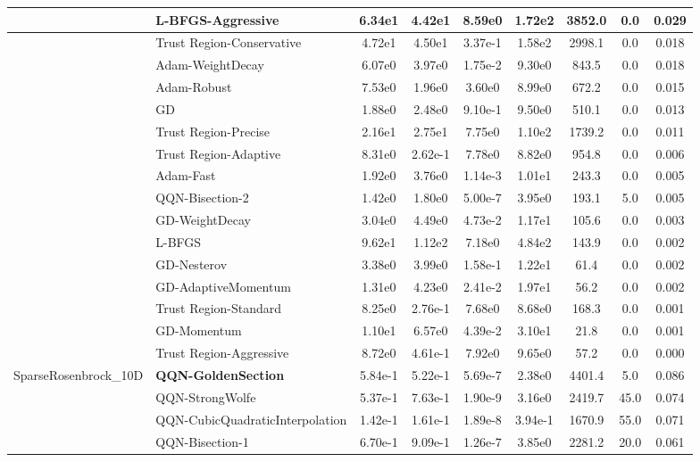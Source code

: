 \documentclass[10pt]{article}
\begin{document}
\begin{longtable}{|l|l|c|c|c|c|c|c|c|}
\hline
 & L-BFGS-Aggressive & 6.34e1 & 4.42e1 & 8.59e0 & 1.72e2 & 3852.0 & 0.0 & 0.029 \\
\hline
 & Trust Region-Conservative & 4.72e1 & 4.50e1 & 3.37e-1 & 1.58e2 & 2998.1 & 0.0 & 0.018 \\
\hline
 & Adam-WeightDecay & 6.07e0 & 3.97e0 & 1.75e-2 & 9.30e0 & 843.5 & 0.0 & 0.018 \\
\hline
 & Adam-Robust & 7.53e0 & 1.96e0 & 3.60e0 & 8.99e0 & 672.2 & 0.0 & 0.015 \\
\hline
 & GD & 1.88e0 & 2.48e0 & 9.10e-1 & 9.50e0 & 510.1 & 0.0 & 0.013 \\
\hline
 & Trust Region-Precise & 2.16e1 & 2.75e1 & 7.75e0 & 1.10e2 & 1739.2 & 0.0 & 0.011 \\
\hline
 & Trust Region-Adaptive & 8.31e0 & 2.62e-1 & 7.78e0 & 8.82e0 & 954.8 & 0.0 & 0.006 \\
\hline
 & Adam-Fast & 1.92e0 & 3.76e0 & 1.14e-3 & 1.01e1 & 243.3 & 0.0 & 0.005 \\
\hline
 & QQN-Bisection-2 & 1.42e0 & 1.80e0 & 5.00e-7 & 3.95e0 & 193.1 & 5.0 & 0.005 \\
\hline
 & GD-WeightDecay & 3.04e0 & 4.49e0 & 4.73e-2 & 1.17e1 & 105.6 & 0.0 & 0.003 \\
\hline
 & L-BFGS & 9.62e1 & 1.12e2 & 7.18e0 & 4.84e2 & 143.9 & 0.0 & 0.002 \\
\hline
 & GD-Nesterov & 3.38e0 & 3.99e0 & 1.58e-1 & 1.22e1 & 61.4 & 0.0 & 0.002 \\
\hline
 & GD-AdaptiveMomentum & 1.31e0 & 4.23e0 & 2.41e-2 & 1.97e1 & 56.2 & 0.0 & 0.002 \\
\hline
 & Trust Region-Standard & 8.25e0 & 2.76e-1 & 7.68e0 & 8.68e0 & 168.3 & 0.0 & 0.001 \\
\hline
 & GD-Momentum & 1.10e1 & 6.57e0 & 4.39e-2 & 3.10e1 & 21.8 & 0.0 & 0.001 \\
\hline
 & Trust Region-Aggressive & 8.72e0 & 4.61e-1 & 7.92e0 & 9.65e0 & 57.2 & 0.0 & 0.000 \\
SparseRosenbrock\_10D & \textbf{QQN-GoldenSection} & 5.84e-1 & 5.22e-1 & 5.69e-7 & 2.38e0 & 4401.4 & 5.0 & 0.086 \\
\hline
 & QQN-StrongWolfe & 5.37e-1 & 7.63e-1 & 1.90e-9 & 3.16e0 & 2419.7 & 45.0 & 0.074 \\
\hline
 & QQN-CubicQuadraticInterpolation & 1.42e-1 & 1.61e-1 & 1.89e-8 & 3.94e-1 & 1670.9 & 55.0 & 0.071 \\
\hline
 & QQN-Bisection-1 & 6.70e-1 & 9.09e-1 & 1.26e-7 & 3.85e0 & 2281.2 & 20.0 & 0.061 \\

\end{longtable}
\end{document}
